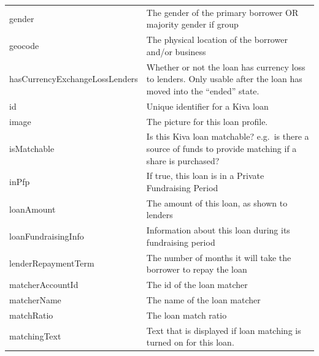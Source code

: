 \begin{longtable}{|p{}|p{}|}
	gender                               & The gender of the primary borrower OR majority gender if
	group                                                                                                    \\
	geocode                              & The physical location of the borrower and/or business             \\
	hasCurrencyExchangeLossLenders       & Whether or not the loan has currency
	loss to lenders. Only usable after the loan has moved into the ``ended''
	state.                                                                                                   \\
	id                                   & Unique identifier for a Kiva loan                                 \\
	image                                & The picture for this loan profile.                                \\
	isMatchable                          & Is this Kiva loan matchable? e.g.~is there a source of
	funds to provide matching if a share is purchased?                                                       \\
	inPfp                                & If true, this loan is in a Private Fundraising Period             \\
	loanAmount                           & The amount of this loan, as shown to lenders                      \\
	loanFundraisingInfo                  & Information about this loan during its fundraising
	period                                                                                                   \\
	lenderRepaymentTerm                  & The number of months it will take the borrower to
	repay the loan                                                                                           \\
	matcherAccountId                     & The id of the loan matcher                                        \\
	matcherName                          & The name of the loan matcher                                      \\
	matchRatio                           & The loan match ratio                                              \\
	matchingText                         & Text that is displayed if loan matching is turned on for
	this loan.                                                                                               \\

\end{longtable}
